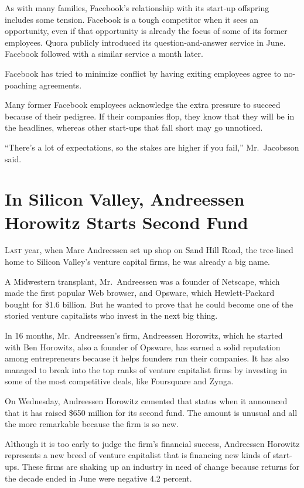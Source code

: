 ﻿\documentclass[12pt]{article}
\begin{document}
As with many families, Facebook's relationship with its start-up offspring includes some tension.
Facebook is a tough competitor when it sees an opportunity, even if that opportunity is already the
focus of some of its former employees. Quora publicly introduced its question-and-answer service in
June. Facebook followed with a similar service a month later.

Facebook has tried to minimize conflict by having exiting employees agree to no-poaching agreements.

Many former Facebook employees acknowledge the extra pressure to succeed because of their pedigree.
If their companies flop, they know that they will be in the headlines, whereas other start-ups that
fall short may go unnoticed.

``There's a lot of expectations, so the stakes are higher if you fail,'' Mr.~Jacobsson said.

\section{In Silicon Valley, Andreessen Horowitz Starts Second Fund}

\lettrine{L}{ast} year, when Marc Andreessen set up shop on Sand Hill Road,
the tree-lined home to Silicon Valley's venture capital firms, he was already a big name.

A Midwestern transplant, Mr.~Andreessen was a founder of Netscape, which made the first popular Web
browser, and Opsware, which Hewlett-Packard bought for \$1.6 billion. But he wanted to prove that he
could become one of the storied venture capitalists who invest in the next big thing.

In 16 months, Mr.~Andreessen's firm, Andreessen Horowitz, which he started with Ben Horowitz, also a
founder of Opsware, has earned a solid reputation among entrepreneurs because it helps founders run
their companies. It has also managed to break into the top ranks of venture capitalist firms by
investing in some of the most competitive deals, like Foursquare and Zynga.

On Wednesday, Andreessen Horowitz cemented that status when it announced that it has raised \$650
million for its second fund. The amount is unusual and all the more remarkable because the firm is
so new.

Although it is too early to judge the firm's financial success, Andreessen Horowitz represents a new
breed of venture capitalist that is financing new kinds of start-ups. These firms are shaking up an
industry in need of change because returns for the decade ended in June were negative 4.2 percent.
\end{document}
